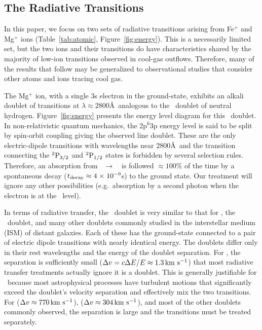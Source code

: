 \documentclass[]{emulateapj}
\begin{document}
\subsection{The Radiative Transitions}

In this paper, we focus on two sets of radiative transitions
arising from Fe$^+$ and Mg$^+$ ions
(Table~\ref{tab:atomic}, Figure~\ref{fig:energy}).
This is a necessarily limited
set, but the two ions and their transitions do have characteristics
shared by the majority of low-ion transitions
observed in cool-gas outflows. Therefore, many
of the results that follow may be generalized to observational studies that
consider other atoms and ions tracing cool gas.

The Mg$^+$ ion, with a single 3s electron in the ground-state,
exhibits an alkali doublet of transitions at $\lambda \approx
2800$\AA\ analogous to the
\lya\ doublet of neutral hydrogen.  Figure~\ref{fig:energy}
presents the energy level diagram for this 
\mgiid\ doublet.  In non-relativistic quantum
mechanics, the 2p$^6$3p energy level is said to be split by spin-orbit
coupling giving the observed line doublet.  These are the only
 electric-dipole transitions 
with wavelengths near 2800\AA\ and the transition connecting
the $\rm {}^2P_{3/2}$ and $\rm {}^2P_{1/2}$ states is forbidden by several
selection rules.  Therefore, an absorption from
\maconfig~$\to$~\mbconfig\
is followed $\approx 100\%$ of the time by a spontaneous decay
($t_{\rm decay} \approx 4{\; \times \; 10^{-9}}$s) to the
ground state. Our treatment will ignore any other possibilities
(e.g.\ absorption by a second photon when the electron is at the \mbconfig\ level).

In terms of radiative transfer, the 
\mgiid\ doublet is very similar to that for 
\lya, the \naid\ doublet, and many other doublets commonly
studied in the interstellar medium (ISM) of distant galaxies.  
Each of these has the ground-state connected to a pair of electric
dipole transitions with nearly identical energy.
The doublets differ only in 
their rest wavelengths and the energy of the doublet separation. 
For \ion{H}{1} \lya, the
separation is sufficiently small ($\Delta v = c \Delta E / E \approx
1.3 \, {\rm km~s^{-1}}$) that most radiative transfer treatments actually ignore it
is a doublet.
This is generally justifiable for \lya\ because 
most astrophysical processes have turbulent motions that
significantly exceed the doublet's velocity separation and effectively mix the
two transitions.  For \ion{Mg}{2} ($\Delta v \approx 770 \, {\rm km~s^{-1}}$),  
\ion{Na}{1} ($\Delta v \approx 304 \, {\rm km~s^{-1}}$), and most of the other doublets
commonly observed, the separation is large and the transitions
must be treated separately.  
\end{document}
